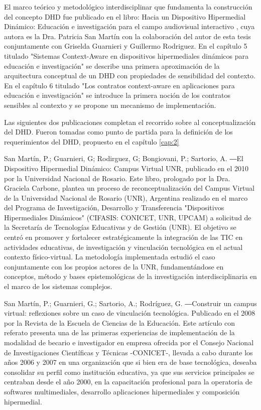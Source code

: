 {El marco teórico y metodológico interdisciplinar que fundamenta la construcción del concepto DHD fue publicado en el
libro: Hacia un Dispositivo Hipermedial Dinámico:
Educación e investigación para el campo audiovisual interactivo \cite{librounq},
cuya autora es la Dra. Patricia San Martín con la colaboración del autor de esta tesis conjuntamente con Griselda Guarnieri y Guillermo Rodriguez. En el capítulo 5 titulado "Sistemas
Context-Aware en dispositivos hipermediales dinámicos para educación e
investigación" se describe una primera aproximación de la arquitectura
conceptual de un DHD con propiedades de sensibilidad del contexto. En el
capítulo 6 titulado "Los contratos context-aware en aplicaciones para educación
e investigación" se introduce la primera noción de los contratos sensibles al
contexto y se propone un mecanismo de implementación. 

Las siguientes dos publicaciones completan el recorrido sobre al
conceptualización del DHD. Fueron tomadas como punto de partida
para la definición de los requerimientos del DHD, propuesto en el capítulo
\ref{cap:2} 

San Martín, P.; Guarnieri, G; Rodirguez, G; Bongiovani, P.; Sartorio, A. ―El
Dispositivo Hipermedial Dinámico: Campus Virtual UNR, publicado en el 2010 por
la Universidad Nacional de Rosario. Este libro, prologado por la Dra.
Graciela Carbone, plantea un proceso de reconceptualización del Campus Virtual
de la Universidad Nacional de Rosario (UNR), Argentina realizado en el marco del
Programa de Investigación, Desarrollo y Transferencia "Dispositivos
Hipermediales Dinámicos" (CIFASIS: CONICET, UNR, UPCAM) a solicitud de la
Secretaría de Tecnologías Educativas y de Gestión (UNR). El objetivo se centró
en promover y fortalecer estratégicamente la integración de las TIC
en actividades educativas, de investigación y vinculación tecnológica en el
actual contexto físico-virtual. La metodología implementada estudió el caso
conjuntamente con los propios actores de la UNR, fundamentándose en conceptos,
método y bases epistemológicas de la investigación interdisciplinaria en el
marco de los sistemas complejos.

San Martín, P.; Guarnieri, G.; Sartorio, A.; Rodríguez, G. ―Construir un campus
virtual: reflexiones sobre un caso de vinculación tecnológica. Publicado en el
2008 por la Revista de la Escuela de Ciencias de la Educación. Este artículo con referato
presenta una de las primeras experiencias de implementación de la modalidad de
becario e investigador en empresa ofrecida por el Consejo Nacional de
Investigaciones Científicas y Técnicas -CONICET-, llevada a cabo durante los
años 2006 y 2007 en una organización que si bien era de base tecnológica,
deseaba consolidar su perfil como institución educativa, ya que sus servicios
principales se centraban desde el año 2000, en la capacitación profesional para
la operatoria de softwares multimediales, desarrollo aplicaciones hipermediales
y composición hipermedial.


}

